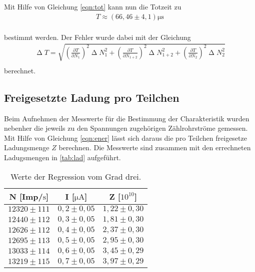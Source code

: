 Mit Hilfe von Gleichung \eqref{eqn:tot} kann nun die Totzeit zu
\begin{align*}
  T \approx (66,46 \pm 4,1)\si{\micro\second} \\
\end{align*}

bestimmt werden.
Der Fehler wurde dabei mit der Gleichung
\begin{align*}
  \upDelta T = \sqrt{\left(\frac{\partial T}{\partial N_1}\right)^2 \upDelta N_1^2 + \left(\frac{\partial T}{\partial N_{1+2}}\right)^2 \upDelta N_{1+2}^2 + \left(\frac{\partial T}{\partial N_2}\right)^2 \upDelta N_2^2   } \\
\end{align*}
berechnet.

\subsection{Freigesetzte Ladung pro Teilchen}

Beim Aufnehmen der Messwerte für die Bestimmung der Charakteristik wurden nebenher die jeweils zu den Spannungen zugehörigen Zählrohrströme gemessen. Mit Hilfe von
Gleichung \eqref{eqn:ener} lässt sich daraus die pro Teilchen freigesetze Ladungsmenge $Z$ berechnen. Die Messwerte sind zusammen mit den errechneten Ladugsmengen in
\autoref{tab:lad} aufgeführt.

\begin{table}[H]
  \caption{Werte der Regression vom Grad drei.}
  \label{tab:lad}
  \centering
  \begin{tabular}{c c c}
      \toprule
      N [Imp/$\si{\second}$] & I [$\si{\micro\ampere}$] & Z [$10^{10}$] \\
      \midrule
      $ 12320 \pm 111 $ & $ 0,2 \pm 0,05 $ & $ 1,22 \pm 0,30 $ \\
      $ 12440 \pm 112 $ & $ 0,3 \pm 0,05 $ & $ 1,81 \pm 0,30 $ \\
      $ 12626 \pm 112 $ & $ 0,4 \pm 0,05 $ & $ 2,37 \pm 0,30 $ \\
      $ 12695 \pm 113 $ & $ 0,5 \pm 0,05 $ & $ 2,95 \pm 0,30 $ \\
      $ 13033 \pm 114 $ & $ 0,6 \pm 0,05 $ & $ 3,45 \pm 0,29 $ \\
      $ 13219 \pm 115 $ & $ 0,7 \pm 0,05 $ & $ 3,97 \pm 0,29 $ \\
      \bottomrule
    \end{tabular}
\end{table}